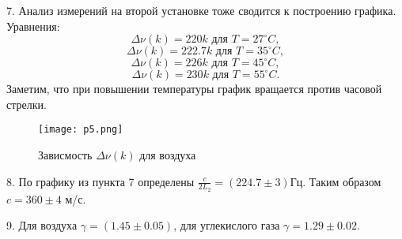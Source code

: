 7. Анализ измерений на второй установке тоже сводится к построению графика. Уравнения:
\[\Delta \nu(k) = 220k \text{ для }T = 27 ^\circ C,\]
\[\Delta \nu(k) = 222.7k \text{ для }T = 35 ^\circ C,\]
\[\Delta \nu(k) = 226k \text{ для }T = 45 ^\circ C,\]
\[\Delta \nu(k) = 230k \text{ для }T = 55 ^\circ C.\]
Заметим, что при повышении температуры график вращается против часовой стрелки.

\begin{figure}
    \centering
    \texttt{[image: p5.png]}
    \caption{Зависмость $\Delta \nu(k)$ для воздуха}
\end{figure}

8. По графику из пункта 7 определены $\frac{c}{2L_2} = (224.7 \pm 3) \text{Гц}$.
Таким образом $c = 360 \pm 4$ м/с.

9. Для воздуха $\gamma = (1.45 \pm 0.05)$, для углекислого газа $\gamma = 1.29 \pm 0.02$.
